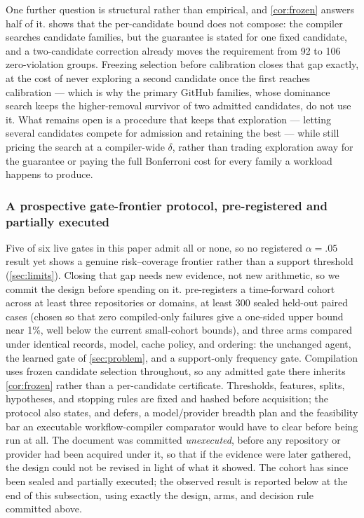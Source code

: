 One further question is structural rather than empirical, and \cref{cor:frozen} answers
half of it.   shows that the per-candidate bound does not compose: the
compiler searches candidate families, but the guarantee is stated for one fixed candidate,
and a two-candidate correction already moves the requirement from 92 to 106 zero-violation
groups.  Freezing selection before calibration closes that gap exactly, at the cost of
never exploring a second candidate once the first reaches calibration --- which is why the
primary GitHub families, whose dominance search keeps the higher-removal survivor of two
admitted candidates, do not use it.  What remains open is a procedure that keeps that
exploration --- letting several candidates compete for admission and retaining the best ---
while still pricing the search at a compiler-wide $\delta$, rather than trading exploration
away for the guarantee or paying the full Bonferroni cost for every family a workload
happens to produce.

\subsubsection{A prospective gate-frontier protocol, pre-registered and partially executed}
\label{sec:prospective-frontier}

Five of six live gates in this paper admit all or none, so no registered $\alpha=.05$
result yet shows a genuine risk--coverage frontier rather than a support threshold
(\cref{sec:limits}).  Closing that gap needs new evidence, not new arithmetic, so we
commit the design before spending on it.
 pre-registers a
time-forward cohort across at least three repositories or domains, at least 300 sealed
held-out paired cases (chosen so that zero compiled-only failures give a one-sided upper
bound near 1\%, well below the current small-cohort bounds), and three arms compared
under identical records, model, cache policy, and ordering: the unchanged agent, the
learned gate of \cref{sec:problem}, and a support-only frequency gate.  Compilation uses
frozen candidate selection throughout, so any admitted gate there inherits
\cref{cor:frozen} rather than a per-candidate certificate.  Thresholds, features, splits,
hypotheses, and stopping rules are fixed and hashed before acquisition; the protocol also
states, and defers, a model/provider breadth plan and the feasibility bar an executable
workflow-compiler comparator would have to clear before being run at all.  The document
was committed \emph{unexecuted}, before any repository or provider had been acquired
under it, so that if the evidence were later gathered, the design could not be revised in
light of what it showed.  The cohort has since been sealed and partially executed; the
observed result is reported below at the end of this subsection, using exactly the
design, arms, and decision rule committed above.

